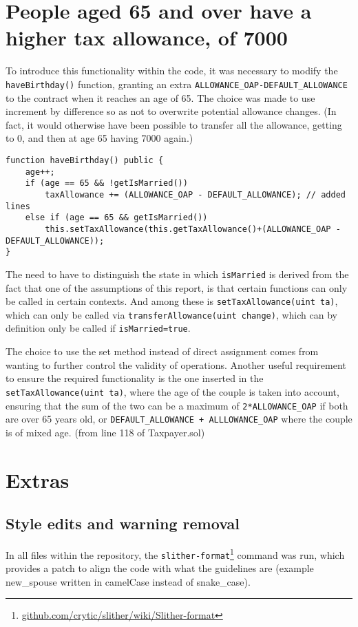 \documentclass{article}
\begin{document}
\section{People aged 65 and over have a higher tax allowance, of 7000}
To introduce this functionality within the code, it was necessary to modify the \texttt{haveBirthday()} function, granting an extra \texttt{ALLOWANCE\_OAP-DEFAULT\_ALLOWANCE} to the contract when it reaches an age of 65.
The choice was made to use increment by difference so as not to overwrite potential allowance changes. (In fact, it would otherwise have been possible to transfer all the allowance, getting to 0, and then at age 65 having 7000 again.)
\begin{verbatim}
function haveBirthday() public {
    age++;
    if (age == 65 && !getIsMarried()) 
        taxAllowance += (ALLOWANCE_OAP - DEFAULT_ALLOWANCE); // added lines
    else if (age == 65 && getIsMarried()) 
        this.setTaxAllowance(this.getTaxAllowance()+(ALLOWANCE_OAP - DEFAULT_ALLOWANCE));
}
\end{verbatim} 
The need to have to distinguish the state in which \texttt{isMarried} is derived from the fact that one of the assumptions of this report, is that certain functions can only be called in certain contexts. And among these is \texttt{setTaxAllowance(uint ta)}, which can only be called via \texttt{transferAllowance(uint change)}, which can by definition only be called if \texttt{isMarried=true}.

The choice to use the set method instead of direct assignment comes from wanting to further control the validity of operations.
Another useful requirement to ensure the required functionality is the one inserted in the \texttt{setTaxAllowance(uint ta)}, where the age of the couple is taken into account, ensuring that the sum of the two can be a maximum of \texttt{2*ALLOWANCE\_OAP} if both are over 65 years old, or \texttt{DEFAULT\_ALLOWANCE + ALLLOWANCE\_OAP} where the couple is of mixed age. (from line 118 of Taxpayer.sol)
\section{Extras}
\subsection{Style edits and warning removal}
In all files within the repository, the \texttt{slither-format}\footnote{\href{https://github.com/crytic/slither/wiki/Slither-format}{github.com/crytic/slither/wiki/Slither-format}} command was run, which provides a patch to align the code with what the guidelines are (example new\_spouse written in camelCase instead of snake\_case).
\end{document}
